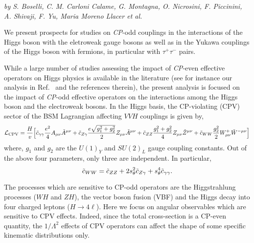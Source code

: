 \begin{center}
\textit{by S. Boselli, C. M. Carloni Calame, G. Montagna,
  O. Nicrosini, F. Piccinini, A. Shivaji, F. Yu, Maria Moreno Llacer
  et al.}
\end{center}

 We present prospects for studies on {\it CP}-odd couplings in the
 interactions of the Higgs boson with the eletroweak gauge bosons as well
 as in the Yukawa couplings of the Higgs boson with fermions, in
 particular with $\tau^+ \tau^-$ pairs.
 

While a large number of studies assessing the impact of {\it CP}-even  
effective operators on Higgs physics is available in the literature 
(see for instance our analysis in Ref.~\cite{Boselli:2017pef} and the references therein), 
the present analysis is focused on the impact of {\it CP}-odd effective operators on the 
interactions among the Higgs boson and the electroweak bosons. 
In the Higgs basis, the CP-violating (CPV) sector of the BSM Lagrangian affecting $VVH$ couplings 
is given by, 
% 
\begin{eqnarray}
\mathcal{L}_{\rm CPV} =  \frac{H}{v} \Big[
\tilde c_{\gamma\gamma} \frac{e^2}{4} A_{\mu\nu}\tilde{A}^{\mu\nu}  
+ \tilde c_{Z\gamma} \frac{e\sqrt{g_1^2 + g_2^2}}{2} Z_{\mu\nu}\tilde{A}^{\mu\nu} 
+ \tilde c_{ZZ} \frac{g_1^2 + g_2^2}{4} Z_{\mu\nu}\tilde{Z}^{\mu\nu} + \tilde{c}_{WW} \frac{g_2^2}{2}  W^+_{\mu\nu} \tilde W^{-\mu\nu}\Big]
\label{eqn:Hvv}
\end{eqnarray}  
where, $g_1$ and $g_2$ are the $U(1)_Y$  and  $SU(2)_L$ gauge coupling constants. Out of the above four 
parameters, only three  are independent. In particular,
\begin{equation}
 \tilde c_{WW} = \tilde c_{ZZ} + 2s_\theta^2 \tilde c_{Z\gamma} + s_\theta^4 \tilde c_{\gamma\gamma}.
\end{equation}

The processes which are sensitive to CP-odd operators are the Higgstrahlung processes ($WH$ and $ZH$), the vector boson fusion (VBF) and the Higgs decay into four charged leptons ($H\to4\ell$). Here we focus on angular observables which are sensitive to CPV effects. Indeed, since the total cross-section is a CP-even quantity,  the $1/\Lambda^2$ effects of CPV operators can affect the shape of some specific kinematic distributions only. 



